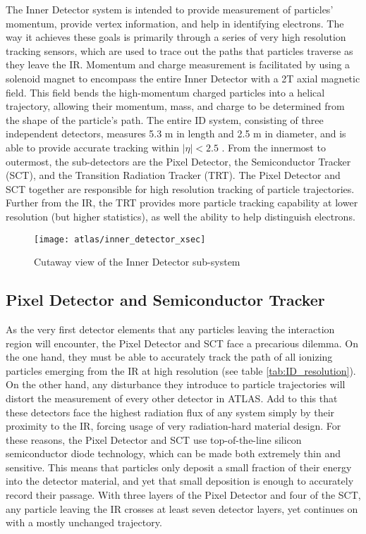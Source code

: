     The Inner Detector system is intended to provide measurement of particles' momentum, provide vertex information, and help in identifying electrons.
    The way it achieves these goals is primarily through a series of very high resolution tracking sensors, which are used to trace out the paths that particles traverse as they leave the IR. 
    Momentum and charge measurement is facilitated by using a solenoid magnet to encompass the entire Inner Detector with a 2T axial magnetic field.
    This field bends the high-momentum charged particles into a helical trajectory, allowing their momentum, mass, and charge to be determined from the shape of the particle's path.
    The entire ID system, consisting of three independent detectors, measures 5.3 m in length and 2.5 m in diameter, and is able to provide accurate tracking within $|\eta| < 2.5$ \cite{id_tdr}.
    From the innermost to outermost, the sub-detectors are the Pixel Detector, the Semiconductor Tracker (SCT), and the Transition Radiation Tracker (TRT).
    The Pixel Detector and SCT together are responsible for high resolution tracking of particle trajectories.
    Further from the IR, the TRT provides more particle tracking capability at lower resolution (but higher statistics), as well the ability to help distinguish electrons. 

    \begin{figure}[h]
        \texttt{[image: atlas/inner\_detector\_xsec]}
        \caption{Cutaway view of the Inner Detector sub-system \cite{atlas_tdr}}
        \label{fig:inner_detector_xsec}
    \end{figure}

    


    \subsection{Pixel Detector and Semiconductor Tracker}
        As the very first detector elements that any particles leaving the interaction region will encounter, the Pixel Detector and SCT face a precarious dilemma.
        On the one hand, they must be able to accurately track the path of all ionizing particles emerging from the IR at high resolution (see table \ref{tab:ID_resolution}).
        On the other hand, any disturbance they introduce to particle trajectories will distort the measurement of every other detector in ATLAS.
        Add to this that these detectors face the highest radiation flux of any system simply by their proximity to the IR, forcing usage of very radiation-hard material design.
        For these reasons, the Pixel Detector and SCT use top-of-the-line silicon semiconductor diode technology, which can be made both extremely thin and sensitive. 
        This means that particles only deposit a small fraction of their energy into the detector material, and yet that small deposition is enough to accurately record their passage.
        With three layers of the Pixel Detector and four of the SCT, any particle leaving the IR crosses at least seven detector layers, yet continues on with a mostly unchanged trajectory.

